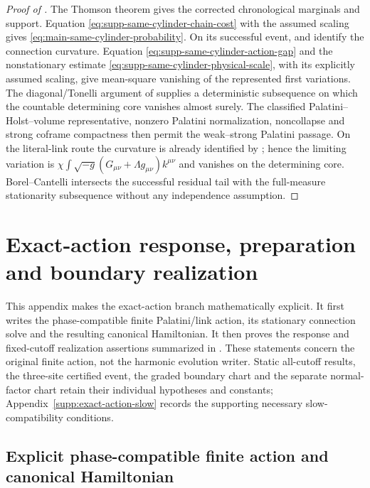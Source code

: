 \documentclass[11pt]{article}
\numberwithin{equation}{section}
\theoremstyle{definition}
\theoremstyle{remark}
\begin{document}
\begin{proof}[Proof of ]
The Thomson theorem gives the corrected chronological marginals and support.
Equation \eqref{eq:supp-same-cylinder-chain-cost} with the assumed scaling
gives \eqref{eq:main-same-cylinder-probability}.  On its successful event,
 and
 identify the connection curvature.
Equation \eqref{eq:supp-same-cylinder-action-gap} and the nonstationary
estimate \eqref{eq:supp-same-cylinder-physical-scale}, with its explicitly
assumed scaling, give mean-square vanishing of the represented first variations.  The diagonal/Tonelli argument of
 supplies a deterministic
subsequence on which the countable determining core vanishes almost surely.
The classified Palatini--Holst--volume representative, nonzero Palatini
normalization, noncollapse and strong coframe compactness then permit the
weak--strong Palatini passage.  On the literal-link route the curvature is
already identified by ; hence the
limiting variation is
$\chi\int\sqrt{-g}(G_{\mu\nu}+\Lambda g_{\mu\nu})k^{\mu\nu}$ and vanishes on
the determining core.  Borel--Cantelli intersects the successful residual
tail with the full-measure stationarity subsequence without any independence
assumption.
\end{proof}


\section{Exact-action response, preparation and boundary realization}
\label{supp:exact-action-audit}
This appendix makes the exact-action branch mathematically explicit.  It first
writes the phase-compatible finite Palatini/link action, its stationary
connection solve and the resulting canonical Hamiltonian.  It then proves the
response and fixed-cutoff realization assertions summarized in
.  These statements concern the original
finite action, not the harmonic evolution writer.  Static all-cutoff results,
the three-site certified event, the graded boundary chart and the separate
normal-factor chart retain their individual hypotheses and constants;
Appendix~\ref{supp:exact-action-slow} records the supporting necessary
slow-compatibility conditions.


\subsection{Explicit phase-compatible finite action and canonical Hamiltonian}
\label{subsec:supp-exact-action-provenance}
\end{document}
